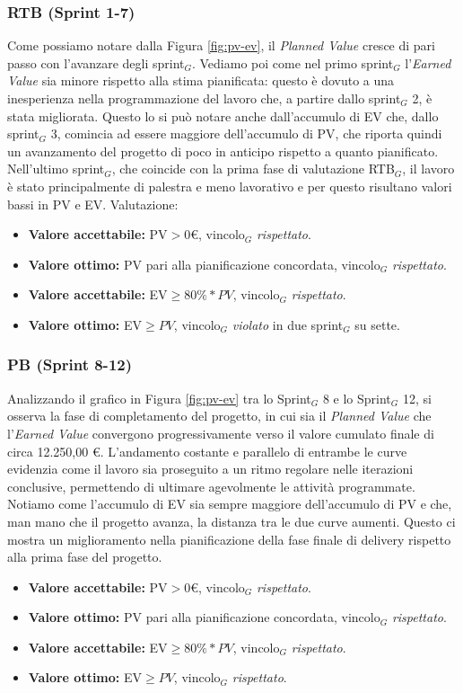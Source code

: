\documentclass[a4paper, 10pt, colorlinks=true, linkcolor=black, urlcolor=blue, citecolor=blue, hidelinks]{article}
\begin{document}
\subsubsection{RTB (Sprint 1-7)}
Come possiamo notare dalla Figura \ref{fig:pv-ev}, il \textit{Planned Value} cresce di pari passo con l'avanzare degli sprint$_G$. Vediamo poi come nel primo sprint$_G$ l'\textit{Earned Value} sia minore rispetto alla stima pianificata: questo è dovuto a una inesperienza nella programmazione del lavoro che, a partire dallo sprint$_G$ 2, è stata migliorata. 
Questo lo si può notare anche dall'accumulo di EV che, dallo sprint$_G$ 3, comincia ad essere maggiore dell'accumulo di PV, che riporta quindi un avanzamento del progetto di poco in anticipo rispetto a quanto pianificato. Nell'ultimo sprint$_G$, che coincide con la prima fase di valutazione RTB$_G$, il lavoro è stato principalmente di palestra e meno lavorativo e per questo risultano valori bassi in PV e EV. Valutazione:
\begin{itemize}
    \item \textbf{Valore accettabile:} PV$>0$€, vincolo$_G$ \textit{rispettato}.
    \item \textbf{Valore ottimo:} PV pari alla pianificazione concordata, vincolo$_G$ \textit{rispettato}.
    \item \textbf{Valore accettabile:} EV$\geq 80\% * PV$, vincolo$_G$ \textit{rispettato}.
    \item \textbf{Valore ottimo:} EV$\geq PV$, vincolo$_G$ \textit{violato} in due sprint$_G$ su sette.
\end{itemize}

\subsubsection{PB (Sprint 8-12)}
Analizzando il grafico in Figura \ref{fig:pv-ev} tra lo Sprint$_G$ 8 e lo Sprint$_G$ 12, si osserva la fase di completamento del progetto, in cui sia il \textit{Planned Value} che l'\textit{Earned Value} convergono progressivamente verso il valore cumulato finale di circa 12.250,00 €. 
L'andamento costante e parallelo di entrambe le curve evidenzia come il lavoro sia proseguito a un ritmo regolare nelle iterazioni conclusive, permettendo di ultimare agevolmente le attività programmate. Notiamo come l'accumulo di EV sia sempre maggiore dell'accumulo di PV e che, man mano che il progetto avanza, la distanza tra le due curve aumenti. Questo ci mostra un miglioramento nella pianificazione della fase finale di delivery rispetto alla prima fase del progetto.
\begin{itemize}
    \item \textbf{Valore accettabile:} PV$>0$€, vincolo$_G$ \textit{rispettato}.
    \item \textbf{Valore ottimo:} PV pari alla pianificazione concordata, vincolo$_G$ \textit{rispettato}.
    \item \textbf{Valore accettabile:} EV$\geq 80\% * PV$, vincolo$_G$ \textit{rispettato}.
    \item \textbf{Valore ottimo:} EV$\geq PV$, vincolo$_G$ \textit{rispettato}.
\end{itemize}
\end{document}

